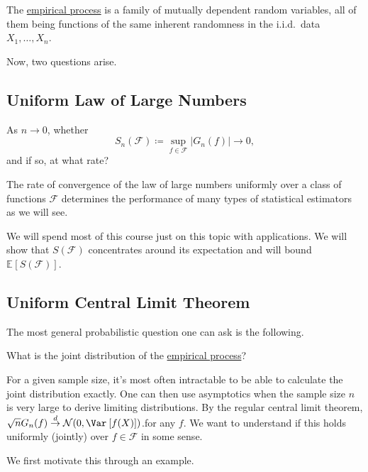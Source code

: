 \begin{remark}
	The \hyperref[def:EP]{empirical process} is a family of mutually dependent random variables, all of them being functions of the same inherent randomness in the i.i.d.\ data \(X_1, \dots , X_n \).
\end{remark}

Now, two questions arise.

\subsection{Uniform Law of Large Numbers}
As \(n \to 0\), whether
\[
	S_n(\mathscr{F} ) \coloneqq \sup _{f\in \mathscr{F} } \vert G_n(f) \vert \to 0,
\]
and if so, at what rate?

\begin{remark}
	The rate of convergence of the law of large numbers uniformly over a class of functions \(\mathscr{F} \) determines the performance of many types of statistical estimators as we will see.
\end{remark}

We will spend most of this course just on this topic with applications. We will show that \(S(\mathscr{F} )\) concentrates around its expectation and will bound \(\mathbb{E}_{}\left[S(\mathscr{F} ) \right] \).

\subsection{Uniform Central Limit Theorem}
The most general probabilistic question one can ask is the following.

\begin{problem*}
	What is the joint distribution of the \hyperref[def:EP]{empirical process}?
\end{problem*}
\begin{answer}
	For a given sample size, it's most often intractable to be able to calculate the joint distribution exactly. One can then use asymptotics when the sample size \(n\) is very large to derive limiting distributions. By the regular central limit theorem, \(\sqrt{n} G_n(f) \overset{d}{\to} \mathcal{N} (0, \Var_{}\left[f(X) \right] )\).for any \(f\). We want to understand if this holds uniformly (jointly) over \(f\in \mathscr{F} \) in some sense.
\end{answer}

We first motivate this through an example.

